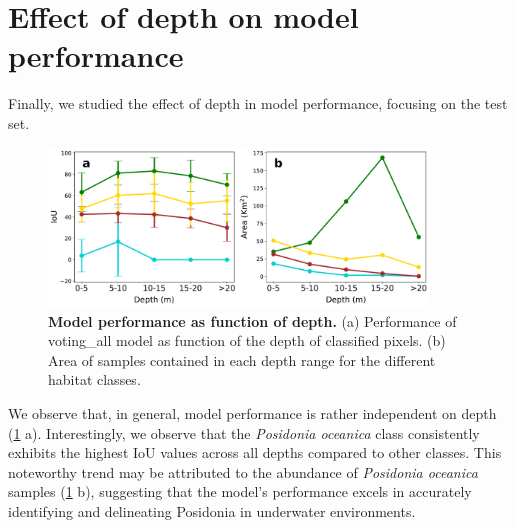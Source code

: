 \section{Effect of depth on model performance}\label{app:depth}

Finally, we studied the effect of depth in model performance, focusing on
the test set.

\begin{figure}[H]
    \centering
    \includegraphics[width=0.9\textwidth]{Figures/IoU_class_depth.pdf}
    \caption[Model performance as function of depth]{\textbf{Model performance
            as function of depth.} (a) Performance of voting\_all model as
        function of the
        depth
        of classified pixels. (b) Area of samples contained in each depth range
        for the
        different habitat classes.}
    \label{fig:IoU_class_depth}
\end{figure}

We observe that, in general, model performance is rather
independent on depth (\cref{fig:IoU_class_depth} a). Interestingly, we observe
that the \textit{Posidonia oceanica} class consistently exhibits the highest
IoU values across all depths compared to other classes. This noteworthy trend
may be attributed to the abundance of \textit{Posidonia oceanica} samples
(\cref{fig:IoU_class_depth} b), suggesting that the model's performance excels
in accurately identifying and delineating Posidonia in underwater environments.

